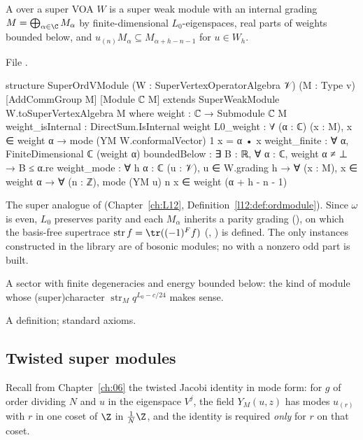 \begin{definition}\label{l17:def:superord}
A  over a super VOA $W$ is a super weak module with an internal grading
$M=\bigoplus_{\alpha\in\C}M_\alpha$ by finite-dimensional $L_0$-eigenspaces, real parts of weights
bounded below, and $u_{(n)}M_\alpha\subseteq M_{\alpha+h-n-1}$ for $u\in W_h$.
\end{definition}
\noindent File .
\begin{leancode}
structure SuperOrdVModule (W : SuperVertexOperatorAlgebra 𝒱) (M : Type v)
    [AddCommGroup M] [Module ℂ M]
    extends SuperWeakModule W.toSuperVertexAlgebra M where
  weight : ℂ → Submodule ℂ M
  weight_isInternal : DirectSum.IsInternal weight
  L0_weight : ∀ (α : ℂ) (x : M), x ∈ weight α →
    mode (YM W.conformalVector) 1 x = α • x
  weight_finite : ∀ α, FiniteDimensional ℂ (weight α)
  boundedBelow : ∃ B : ℝ, ∀ α : ℂ, weight α ≠ ⊥ → B ≤ α.re
  weight_mode : ∀ {h α : ℂ} (u : 𝒱), u ∈ W.grading h →
    ∀ (x : M), x ∈ weight α → ∀ (n : ℤ),
      mode (YM u) n x ∈ weight (α + h - n - 1)
\end{leancode}
\begin{dictionary}
The super analogue of  (Chapter~\ref{ch:L12}, Definition~\ref{l12:def:ordmodule}).
Since $\omega$ is even, $L_0$ preserves parity and each $M_\alpha$ inherits a parity grading
(), on which the basis-free supertrace
$\operatorname{str}f=\tr((-1)^Ff)$ (, )
is defined. The only instances constructed in the library are  of bosonic
modules; no  with a nonzero odd part is built.
\end{dictionary}
\begin{physics}
A sector with finite degeneracies and energy bounded below: the kind of module whose (super)character
$\operatorname{str}_Mq^{L_0-c/24}$ makes sense.
\end{physics}
\begin{status}
A definition; standard axioms.
\end{status}

\subsection{Twisted super modules}

Recall from Chapter~\ref{ch:06} the twisted Jacobi identity in mode form: for $g$ of order dividing
$N$ and $u$ in the eigenspace $V^j$, the field $Y_M(u,z)$ has modes $u_{(r)}$ with $r$ in one coset of
$\Z$ in $\frac1N\Z$, and the identity is required \emph{only} for $r$ on that coset.

